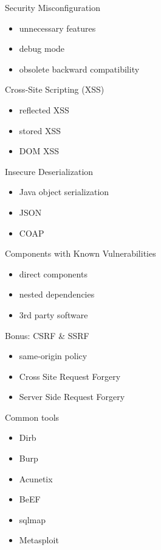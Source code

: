 \documentclass{curs}
\begin{document}
\begin{frame}{Security Misconfiguration}
  \begin{itemize}
    \item unnecessary features
    \item debug mode
    \item obsolete backward compatibility
  \end{itemize}
\end{frame}

\begin{frame}{Cross-Site Scripting (XSS)}
  \begin{itemize}
    \item reflected XSS
    \item stored XSS
    \item DOM XSS
  \end{itemize}
\end{frame}

\begin{frame}{Insecure Deserialization}
  \begin{itemize}
    \item Java object serialization
    \item JSON
    \item COAP
  \end{itemize}
\end{frame}

\begin{frame}{Components with Known Vulnerabilities}
  \begin{itemize}
    \item direct components
    \item nested dependencies
    \item 3rd party software
  \end{itemize}
\end{frame}

\begin{frame}{Bonus: CSRF \& SSRF}
  \begin{itemize}
    \item same-origin policy
    \item Cross Site Request Forgery
    \item Server Side Request Forgery
  \end{itemize}
\end{frame}

\begin{frame}{Common tools}
  \begin{itemize}
    \item Dirb
    \item Burp
    \item Acunetix
    \item BeEF
    \item sqlmap
    \item Metasploit
  \end{itemize}
\end{frame}
\end{document}
